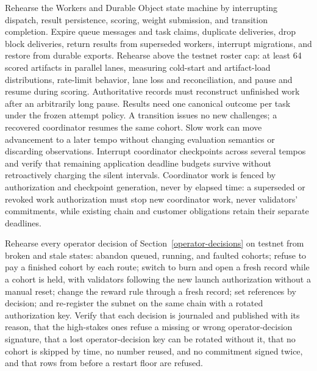 Rehearse the Workers and Durable Object state machine by interrupting dispatch,
result persistence, scoring, weight submission, and transition completion.
Expire queue messages and task claims, duplicate deliveries, drop block deliveries,
return results from superseded workers, interrupt migrations, and restore from
durable exports. Rehearse above the testnet roster cap: at least 64 scored artifacts in
parallel lanes, measuring cold-start and artifact-load distributions, rate-limit
behavior, lane loss and reconciliation, and pause and resume during scoring.
Authoritative records must reconstruct unfinished work after an arbitrarily long
pause. Results need one canonical outcome per task under
the frozen attempt policy. A transition issues no new challenges; a recovered
coordinator resumes the same cohort. Slow work can move advancement to a later
tempo without changing evaluation semantics or discarding observations.
Interrupt coordinator checkpoints across several tempos and verify that
remaining application deadline budgets survive without retroactively charging
the silent intervals. Coordinator work is fenced by authorization and
checkpoint generation, never by elapsed time: a superseded or revoked work
authorization must stop new coordinator work, never validators' commitments,
while existing chain and customer obligations retain their separate deadlines.

Rehearse every operator decision of Section~\ref{operator-decisions} on
testnet from broken and stale states: abandon queued, running, and faulted
cohorts; refuse to pay a finished cohort by each route; switch to burn and open
a fresh record while a cohort is held, with validators following the new launch
authorization without a manual reset; change the reward rule through a fresh
record; set references by decision; and re-register the subnet on the same
chain with a rotated authorization key. Verify that each decision is journaled
and published with its reason, that the high-stakes ones refuse a missing or
wrong operator-decision signature, that a lost operator-decision key can be
rotated without it, that no cohort is skipped by time, no number reused, and no
commitment signed twice, and that rows from before a restart floor are refused.

